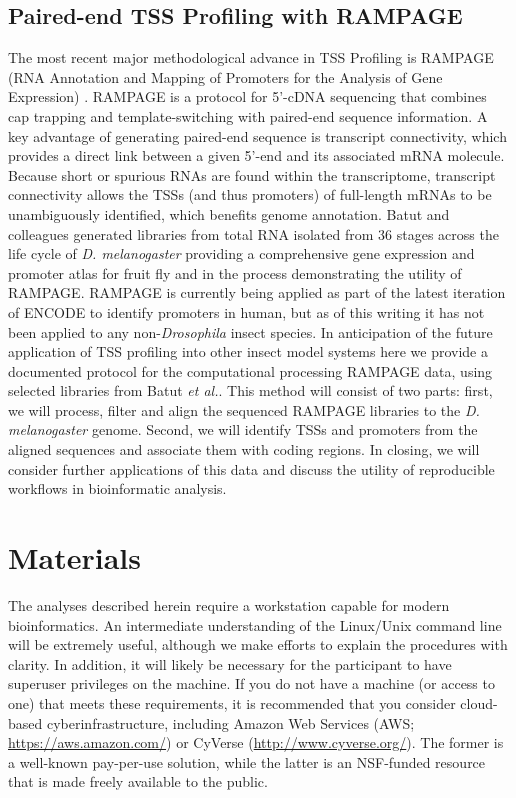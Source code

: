 \documentclass[runningheads,a4paper]{llncs}
\begin{document}
\begin{linenumbers}
\subsection{Paired-end TSS Profiling with RAMPAGE}
The most recent major methodological advance in TSS Profiling is RAMPAGE (RNA Annotation and Mapping of Promoters for the Analysis of Gene Expression)  . 
RAMPAGE is a protocol for 5'-cDNA sequencing that combines cap trapping and template-switching with paired-end sequence information. 
A key advantage of generating paired-end sequence is transcript connectivity, which provides a direct link between a given 5'-end and its associated mRNA molecule.
Because short or spurious RNAs are found within the transcriptome, transcript connectivity allows the TSSs (and thus promoters) of full-length mRNAs to be unambiguously identified, which benefits genome annotation.
Batut and colleagues generated libraries from total RNA isolated from 36 stages across the life cycle of \textit{D. melanogaster} providing a comprehensive gene expression and promoter atlas for fruit fly and in the process demonstrating the utility of RAMPAGE.
RAMPAGE is currently being applied as part of the latest iteration of ENCODE to identify promoters in human, but as of this writing it has not been applied to any non-\textit{Drosophila} insect species. 
In anticipation of the future application of TSS profiling into other insect model systems here we provide a documented protocol for the computational processing RAMPAGE data, using selected libraries from Batut \textit{et al.}. 
This method will consist of two parts: first, we will process, filter and align the sequenced RAMPAGE libraries to the \textit{D. melanogaster} genome. 
Second, we will identify TSSs and promoters from the aligned sequences and associate them with coding regions.
In closing, we will consider further applications of this data and discuss the utility of reproducible workflows in bioinformatic analysis.


\section{Materials}

The analyses described herein require a workstation capable for modern bioinformatics. 
An intermediate understanding of the Linux/Unix command line will be extremely useful, although we make efforts to explain the procedures with clarity. In addition, it will likely be necessary for the participant to have superuser privileges on the machine.
If you do not have a machine (or access to one) that meets these requirements, it is recommended that you consider cloud-based cyberinfrastructure, including Amazon Web Services (AWS; \url{https://aws.amazon.com/}) or CyVerse (\url{http://www.cyverse.org/}).
The former is a well-known pay-per-use solution, while the latter is an NSF-funded resource that is made freely available to the public.


\end{linenumbers}
\end{document}
